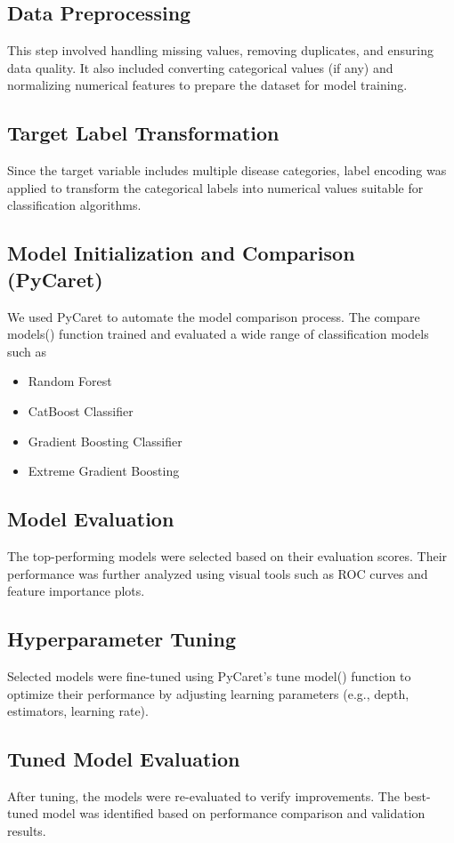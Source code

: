 \documentclass[journal]{IEEEtran}
\begin{document}
\subsection{Data Preprocessing}
This step involved handling missing values, removing duplicates, and ensuring data quality. It also included converting categorical values (if any) and normalizing numerical features to prepare the dataset for model training.

\subsection{Target Label Transformation}
Since the target variable includes multiple disease categories, label encoding was applied to transform the categorical labels into numerical values suitable for classification algorithms.

\subsection{Model Initialization and Comparison (PyCaret)}
We used PyCaret to automate the model comparison process. The compare models() function trained and evaluated a wide range of classification models such as
\begin{itemize}
    \item Random Forest
    \item CatBoost Classifier
    \item Gradient Boosting Classifier
    \item Extreme Gradient Boosting
\end{itemize}


\subsection{Model Evaluation}
The top-performing models were selected based on their evaluation scores. Their performance was further analyzed using visual tools such as ROC curves and feature importance plots.

\subsection{Hyperparameter Tuning}
Selected models were fine-tuned using PyCaret’s tune model() function to optimize their performance by adjusting learning parameters (e.g., depth, estimators, learning rate).


\subsection{Tuned Model Evaluation}
After tuning, the models were re-evaluated to verify improvements. The best-tuned model was identified based on performance comparison and validation results.
\end{document}
